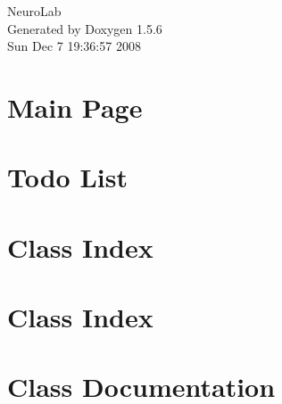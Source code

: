 \documentclass[a4paper]{book}
\begin{document}
\begin{titlepage}
\vspace*{7cm}
\begin{center}
{\Large NeuroLab }\\
\vspace*{1cm}
{\large Generated by Doxygen 1.5.6}\\
\vspace*{0.5cm}
{\small Sun Dec 7 19:36:57 2008}\\
\end{center}
\end{titlepage}
\clearemptydoublepage
{}
\tableofcontents
\clearemptydoublepage
{}
\chapter{Main Page}
\label{index}
\chapter{Todo List}
\label{todo}

\chapter{Class Index}

\chapter{Class Index}

\chapter{Class Documentation}












































\printindex
\end{document}
